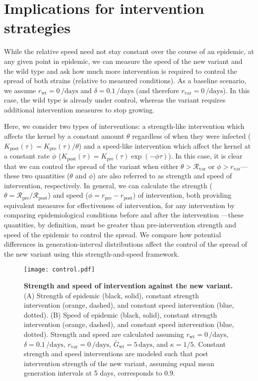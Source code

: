 \documentclass[12pt]{article}
\newcommand{\vvvar}{\mathrm{var}}
\newcommand{\wwwt}{\mathrm{wt}}
\newcommand{\rx}[1]{\ensuremath{{r}_{#1}}\xspace}
\newcommand{\ry}[1]{\rx{\mathrm{#1}}}
\newcommand{\rw}{\rx{\wwwt}}
\newcommand{\rv}{\rx{\vvvar}}
\newcommand{\Rx}[1]{\ensuremath{{\mathcal R}_{#1}}\xspace}
\newcommand{\Ry}[1]{\Rx{\mathrm{#1}}}
\newcommand{\Rv}{\Rx{\vvvar}}
\newcommand{\Gx}[1]{\ensuremath{{\bar G}_{#1}}\xspace}
\newcommand{\Gy}[1]{\Gx{\mathrm{#1}}}
\begin{document}
\section{Implications for intervention strategies}

While the relative speed need not stay constant over the course of an epidemic, at any given point in epidemic, we can measure the speed of the new variant and the wild type and ask how much more intervention is required to control the spread of both strains (relative to measured conditions).
As a baseline scenario, we assume $\rw=0\,\textrm{/days}$ and $\delta=0.1\,\textrm{/days}$ (and therefore $\rv=0\,\textrm{/days}$).
In this case, the wild type is already under control, whereas the variant requires additional intervention measures to stop growing.

Here, we consider two types of interventions:
a strength-like intervention which affects the kernel by a constant amount $\theta$ regardless of when they were infected ($K_{\mathrm{post}}(\tau) = K_{\mathrm{pre}}(\tau)/\theta$) and a speed-like intervention which affect the kernel at a constant rate $\phi$ ($K_{\mathrm{post}}(\tau) = K_{\mathrm{pre}}(\tau) \exp(-\phi \tau)$).
In this case, it is clear that we can control the spread of the variant when either $\theta > \Rv$ or $\phi > \rv$---these two quantities ($\theta$ and $\phi$) are also referred to as strength and speed of intervention, respectively.
In general, we can calculate the strength ($\theta = \Ry{pre}/\Ry{post}$) and speed ($\phi = \ry{pre} - \ry{post}$) of intervention, both providing equivalent measures for effectiveness of intervention, for any intervention by comparing epidemiological conditions before and after the intervention \citep{doi:10.1098/rspb.2020.1556}---these quantities, by definition, must be greater than pre-intervention strength and speed of the epidemic to control the spread.
We compare how potential differences in generation-interval distributions affect the control of the spread of the new variant using this strength-and-speed framework.

\begin{figure}[!th]
\texttt{[image: control.pdf]}
\caption{
\textbf{Strength and speed of intervention against the new variant.}
(A) Strength of epidemic (black, solid), constant strength intervention (orange, dashed), and constant speed intervention (blue, dotted).
(B) Speed of epidemic (black, solid), constant strength intervention (orange, dashed), and constant speed intervention (blue, dotted).
Strength and speed are calculated assuming $\rw=0\,\textrm{/days}$, $\delta=0.1\,\textrm{/days}$, $\rv=0\,\textrm{/days}$, $\Gy{wt}=5\,\textrm{days}$, and $\kappa=1/5$.
Constant strength and speed interventions are modeled such that post intervention strength of the new variant, assuming equal mean generation intervals at 5 days, corresponds to 0.9.
}
\label{fig:strengthspeed}
\end{figure}
\end{document}
